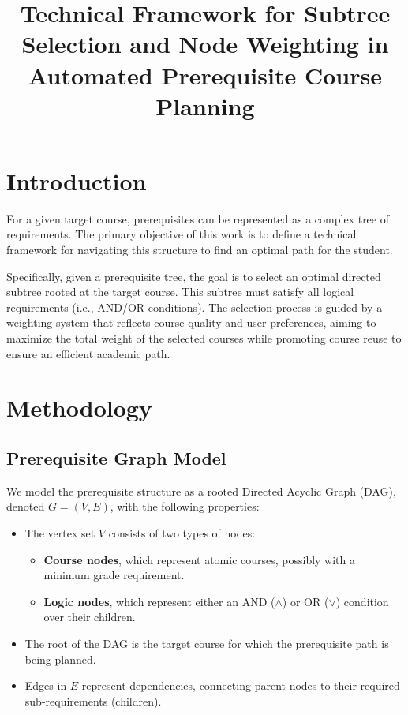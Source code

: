 \documentclass[11pt]{article}
\title{Technical Framework for Subtree Selection and Node Weighting in Automated Prerequisite Course Planning}
\author{}
\date{}
\begin{document}
\maketitle

\section{Introduction}

For a given target course, prerequisites can be represented as a complex tree of requirements. The primary objective of this work is to define a technical framework for navigating this structure to find an optimal path for the student.

Specifically, given a prerequisite tree, the goal is to select an optimal directed subtree rooted at the target course. This subtree must satisfy all logical requirements (i.e., AND/OR conditions). The selection process is guided by a weighting system that reflects course quality and user preferences, aiming to maximize the total weight of the selected courses while promoting course reuse to ensure an efficient academic path.

\section{Methodology}

\subsection{Prerequisite Graph Model}

We model the prerequisite structure as a rooted Directed Acyclic Graph (DAG), denoted $G = (V, E)$, with the following properties:
\begin{itemize}
    \item The vertex set $V$ consists of two types of nodes:
    \begin{itemize}
        \item \textbf{Course nodes}, which represent atomic courses, possibly with a minimum grade requirement.
        \item \textbf{Logic nodes}, which represent either an AND ($\land$) or OR ($\lor$) condition over their children.
    \end{itemize}
    \item The root of the DAG is the target course for which the prerequisite path is being planned.
    \item Edges in $E$ represent dependencies, connecting parent nodes to their required sub-requirements (children).
\end{itemize}
\end{document}
